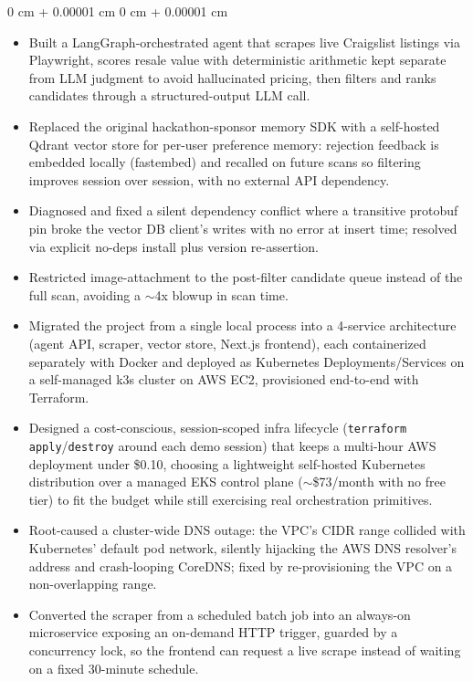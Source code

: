 \documentclass[10pt, letterpaper]{article}
\newenvironment{highlights}{
    \begin{itemize}[
        topsep=0.3 cm,
        parsep=0.05 cm,
        partopsep=0pt,
        itemsep=0.02 cm,
        leftmargin=0 cm + 10pt
    ]
}{
    \end{itemize}
} %
\newenvironment{onecolentry}{
    \begin{adjustwidth}{
        0 cm + 0.00001 cm
    }{
        0 cm + 0.00001 cm
    }
}{
    \end{adjustwidth}
} %
\begin{document}
        \vspace{0.10 cm}
        \begin{onecolentry}
            \begin{highlights}
                \item Built a LangGraph-orchestrated agent that scrapes live Craigslist listings via Playwright, scores resale value with deterministic arithmetic kept separate from LLM judgment to avoid hallucinated pricing, then filters and ranks candidates through a structured-output LLM call.
                \item Replaced the original hackathon-sponsor memory SDK with a self-hosted Qdrant vector store for per-user preference memory: rejection feedback is embedded locally (fastembed) and recalled on future scans so filtering improves session over session, with no external API dependency.
                \item Diagnosed and fixed a silent dependency conflict where a transitive protobuf pin broke the vector DB client's writes with no error at insert time; resolved via explicit no-deps install plus version re-assertion.
                \item Restricted image-attachment to the post-filter candidate queue instead of the full scan, avoiding a $\sim$4x blowup in scan time.
                \item Migrated the project from a single local process into a 4-service architecture (agent API, scraper, vector store, Next.js frontend), each containerized separately with Docker and deployed as Kubernetes Deployments/Services on a self-managed k3s cluster on AWS EC2, provisioned end-to-end with Terraform.
                \item Designed a cost-conscious, session-scoped infra lifecycle (\texttt{terraform apply}/\texttt{destroy} around each demo session) that keeps a multi-hour AWS deployment under \$0.10, choosing a lightweight self-hosted Kubernetes distribution over a managed EKS control plane ($\sim$\$73/month with no free tier) to fit the budget while still exercising real orchestration primitives.
                \item Root-caused a cluster-wide DNS outage: the VPC's CIDR range collided with Kubernetes' default pod network, silently hijacking the AWS DNS resolver's address and crash-looping CoreDNS; fixed by re-provisioning the VPC on a non-overlapping range.
                \item Converted the scraper from a scheduled batch job into an always-on microservice exposing an on-demand HTTP trigger, guarded by a concurrency lock, so the frontend can request a live scrape instead of waiting on a fixed 30-minute schedule.

\end{highlights}
\end{onecolentry}
\end{document}
